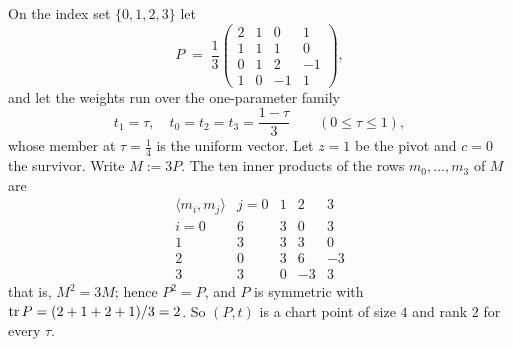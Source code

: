 \begin{example}\label{ex:liftfailure}
On the index set $\{0,1,2,3\}$ let
\begin{equation}\label{eq:liftchart}
  P\;=\;\frac13\begin{pmatrix}
    2&1&0&1\\ 1&1&1&0\\ 0&1&2&-1\\ 1&0&-1&1\end{pmatrix},
\end{equation}
and let the weights run over the one-parameter family
\begin{equation}\label{eq:liftweights}
  t_1=\tau,\quad t_0=t_2=t_3=\frac{1-\tau}{3}
  \qquad(0\le\tau\le1),
\end{equation}
whose member at $\tau=\tfrac14$ is the uniform vector.  Let $z=1$ be the
pivot and $c=0$ the survivor.  Write $M:=3P$.  The
ten inner products of the rows $m_0,\dots,m_3$ of $M$ are
\[
  \begin{array}{c|cccc}
   \langle m_i,m_j\rangle & j=0&1&2&3\\ \hline
   i=0 & 6&3&0&3\\
   1 & 3&3&3&0\\
   2 & 0&3&6&-3\\
   3 & 3&0&-3&3
  \end{array}
\]
that is, $M^{2}=3M$; hence $P^{2}=P$, and $P$ is symmetric with
$\operatorname{tr} P=(2+1+2+1)/3=2$.  So $(P,t)$ is a chart point of size $4$ and rank
$2$ for every $\tau$.


\end{example}
